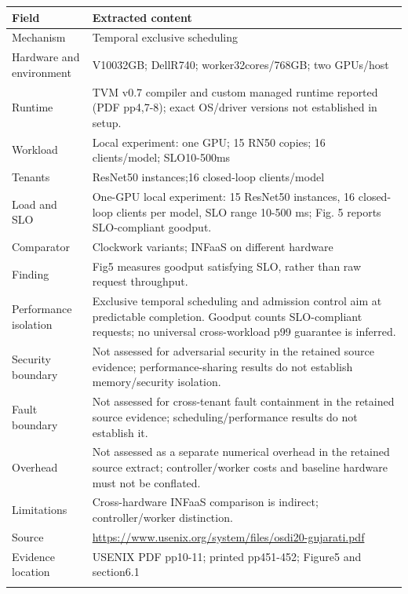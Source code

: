 \begin{longtable}{>{\raggedright\arraybackslash}p{}>{\raggedright\arraybackslash}p{}}
\toprule
\textbf{Field} & \textbf{Extracted content}\\\midrule\endhead
Mechanism & Temporal exclusive scheduling\\\addlinespace
Hardware and environment & V10032GB; DellR740; worker32cores/768GB; two GPUs/host\\\addlinespace
Runtime & TVM v0.7 compiler and custom managed runtime reported (PDF pp4,7-8); exact OS/driver versions not established in setup.\\\addlinespace
Workload & Local experiment: one GPU; 15 RN50 copies; 16 clients/model; SLO10-500ms\\\addlinespace
Tenants & 15 ResNet50 instances;16 closed-loop clients/model\\\addlinespace
Load and SLO & One-GPU local experiment: 15 ResNet50 instances, 16 closed-loop clients per model, SLO range 10-500 ms; Fig. 5 reports SLO-compliant goodput.\\\addlinespace
Comparator & Clockwork variants; INFaaS on different hardware\\\addlinespace
Finding & Fig5 measures goodput satisfying SLO, rather than raw request throughput.\\\addlinespace
Performance isolation & Exclusive temporal scheduling and admission control aim at predictable completion. Goodput counts SLO-compliant requests; no universal cross-workload p99 guarantee is inferred.\\\addlinespace
Security boundary & Not assessed for adversarial security in the retained source evidence; performance-sharing results do not establish memory/security isolation.\\\addlinespace
Fault boundary & Not assessed for cross-tenant fault containment in the retained source evidence; scheduling/performance results do not establish it.\\\addlinespace
Overhead & Not assessed as a separate numerical overhead in the retained source extract; controller/worker costs and baseline hardware must not be conflated.\\\addlinespace
Limitations & Cross-hardware INFaaS comparison is indirect; controller/worker distinction.\\\addlinespace
Source & \url{https://www.usenix.org/system/files/osdi20-gujarati.pdf}\\\addlinespace
Evidence location & USENIX PDF pp10-11; printed pp451-452; Figure5 and section6.1\\\addlinespace
\bottomrule\end{longtable}

